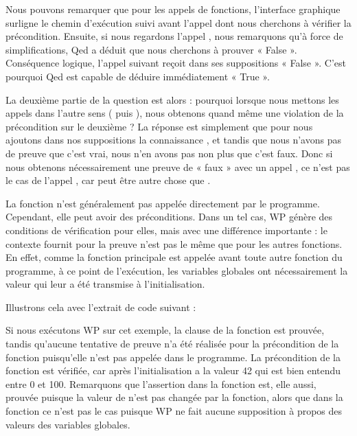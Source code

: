 Nous pouvons remarquer que pour les appels de fonctions, l'interface graphique
surligne le chemin d'exécution suivi avant l'appel dont nous cherchons à
vérifier la précondition. Ensuite, si nous regardons l'appel ,
nous remarquons qu'à force de simplifications, Qed a déduit que nous
cherchons à prouver « False ». Conséquence logique, l'appel suivant 
reçoit dans ses suppositions « False ». C'est pourquoi Qed est capable de déduire
immédiatement « True ».



La deuxième partie de la question est alors : pourquoi lorsque nous mettons les
appels dans l'autre sens ( puis ), nous obtenons
quand même une violation de la précondition sur le deuxième ? La réponse est
simplement que pour  nous ajoutons dans nos suppositions la
connaissance , et tandis que nous n'avons pas de preuve
que c'est vrai, nous n'en avons pas non plus que c'est faux. Donc si nous obtenons
nécessairement une preuve de « faux » avec un appel , ce n'est
pas le cas de l'appel , car  peut être autre
chose que .




La fonction  n'est généralement pas appelée directement par le
programme. Cependant, elle peut avoir des préconditions. Dans un tel cas, WP
génère des conditions de vérification pour elles, mais avec une différence
importante : le contexte fournit pour la preuve n'est pas le même que pour les
autres fonctions. En effet, comme la fonction principale est appelée avant toute
autre fonction du programme, à ce point de l'exécution, les variables globales
ont nécessairement la valeur qui leur a été transmise à l'initialisation.


Illustrons cela avec l'extrait de code suivant :




Si nous exécutons WP sur cet exemple, la clause  de la
fonction  est prouvée, tandis qu'aucune tentative de preuve n'a
été réalisée pour la précondition de la fonction  puisqu'elle
n'est pas appelée dans le programme. La précondition de la fonction
 est vérifiée, car après l'initialisation  a la
valeur 42 qui est bien entendu entre 0 et 100. Remarquons que l'assertion dans
la fonction  est, elle aussi, prouvée puisque la valeur de
 n'est pas changée par la fonction, alors que dans la fonction
 ce n'est pas le cas puisque WP ne fait aucune supposition à
propos des valeurs des variables globales.



